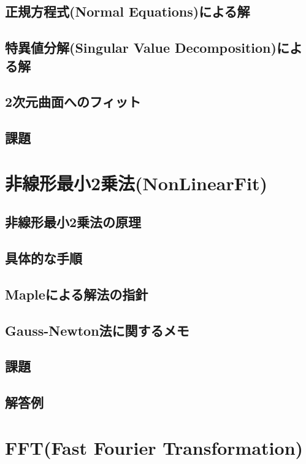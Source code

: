 \documentclass[10pt,a4j]{jsbook}
\begin{document}
\section{正規方程式(Normal Equations)による解}
 
\section{特異値分解(Singular Value Decomposition)による解}
 
\section{2次元曲面へのフィット}
 
\section{課題}
 


\chapter{非線形最小2乗法(NonLinearFit)}
\section{非線形最小2乗法の原理}
 
\section{具体的な手順}
 
\section{Mapleによる解法の指針}
 
\section{Gauss-Newton法に関するメモ}
 
\section{課題}
 
\section{解答例}
 

\chapter{FFT(Fast Fourier Transformation)}
\end{document}
